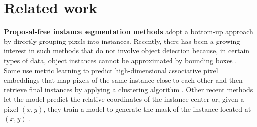 
\section{Related work} \label{sec:related_work}

\textbf{Proposal-free instance segmentation methods} adopt a bottom-up approach by directly grouping pixels into instances. Recently, there has been a growing interest in such  methods that do not involve object detection because, in certain types of data, object instances cannot be approximated by bounding boxes \cite{kirillov2017instancecut,bai2017deep}. 
Some use metric learning to predict high-dimensional associative pixel embeddings that map pixels of the same instance close to each other \cite{lee2019learning,fathi2017semantic,newell2017associative,de2017semantic}
and then retrieve final instances by applying a clustering algorithm \cite{kong2018recurrentPix}.
Other recent methods let the model predict the relative coordinates of the instance center \cite{neven2019instance,cheng2019panopticdeeplab} or, given a pixel $(x,y)$, they train a model to generate the mask of the instance located at $(x,y)$ \cite{sofiiuk2019adaptis}. 

